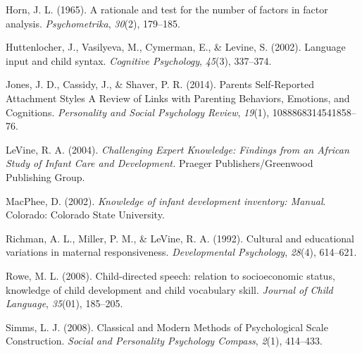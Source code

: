 \documentclass[floatsintext,man]{apa6}
\theoremstyle{definition}
\theoremstyle{definition}
\theoremstyle{definition}
\theoremstyle{remark}
\begin{document}
\hypertarget{ref-horn1965}{}
Horn, J. L. (1965). A rationale and test for the number of factors in
factor analysis. \emph{Psychometrika}, \emph{30}(2), 179--185.

\hypertarget{ref-huttenlocher2002}{}
Huttenlocher, J., Vasilyeva, M., Cymerman, E., \& Levine, S. (2002).
Language input and child syntax. \emph{Cognitive Psychology},
\emph{45}(3), 337--374.

\hypertarget{ref-jones2014}{}
Jones, J. D., Cassidy, J., \& Shaver, P. R. (2014). Parents
Self-Reported Attachment Styles A Review of Links with Parenting
Behaviors, Emotions, and Cognitions. \emph{Personality and Social
Psychology Review}, \emph{19}(1), 1088868314541858--76.

\hypertarget{ref-levine2004}{}
LeVine, R. A. (2004). \emph{Challenging Expert Knowledge: Findings from
an African Study of Infant Care and Development.} Praeger
Publishers/Greenwood Publishing Group.

\hypertarget{ref-macphee2002}{}
MacPhee, D. (2002). \emph{Knowledge of infant development inventory:
Manual}. Colorado: Colorado State University.

\hypertarget{ref-richman1992}{}
Richman, A. L., Miller, P. M., \& LeVine, R. A. (1992). Cultural and
educational variations in maternal responsiveness. \emph{Developmental
Psychology}, \emph{28}(4), 614--621.

\hypertarget{ref-rowe2008}{}
Rowe, M. L. (2008). Child-directed speech: relation to socioeconomic
status, knowledge of child development and child vocabulary skill.
\emph{Journal of Child Language}, \emph{35}(01), 185--205.

\hypertarget{ref-simms2008}{}
Simms, L. J. (2008). Classical and Modern Methods of Psychological Scale
Construction. \emph{Social and Personality Psychology Compass},
\emph{2}(1), 414--433.

\endgroup
\end{document}
